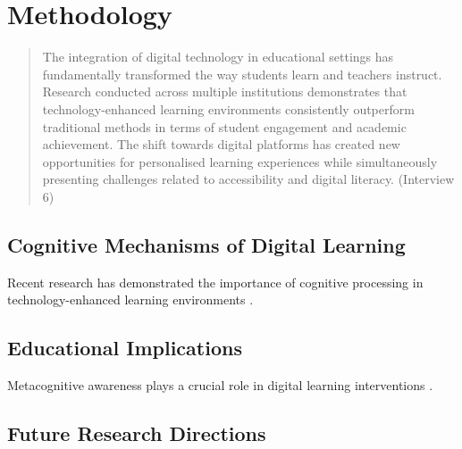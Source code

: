 \documentclass[12pt]{article}
\begin{document}
\section{Methodology}
\begin{sectiontext}
\lipsum

\begin{quote}
    The integration of digital technology in educational settings has fundamentally transformed the way students learn and teachers instruct. Research conducted across multiple institutions demonstrates that technology-enhanced learning environments consistently outperform traditional methods in terms of student engagement and academic achievement. The shift towards digital platforms has created new opportunities for personalised learning experiences while simultaneously presenting challenges related to accessibility and digital literacy. (Interview 6)
\end{quote}
\end{sectiontext}

\printnotes

\startcommentaries


\begin{commentarycontent}

\subsection{Cognitive Mechanisms of Digital Learning}
Recent research has demonstrated the importance of cognitive processing in technology-enhanced learning environments \parencite{rodriguez2023cognitive}. \lipsum[1]

\subsection{Educational Implications}
Metacognitive awareness plays a crucial role in digital learning interventions \parencite{patel2023metacognitive}. \lipsum[1]

\subsection{Future Research Directions}
\lipsum[1]
\end{commentarycontent}
\end{document}

